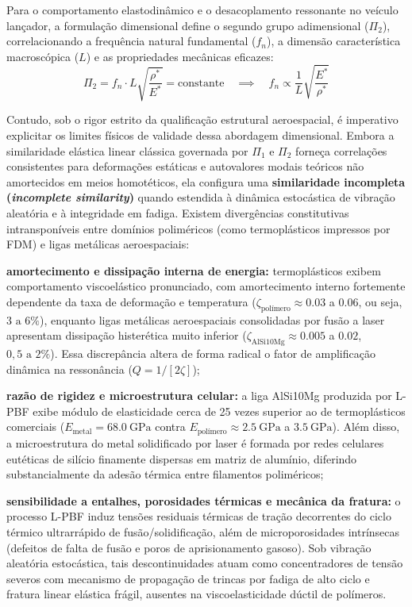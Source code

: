 Para o comportamento elastodinâmico e o desacoplamento ressonante no veículo lançador, a formulação dimensional define o segundo grupo adimensional ($\Pi_2$), correlacionando a frequência natural fundamental ($f_n$), a dimensão característica macroscópica ($L$) e as propriedades mecânicas eficazes:
\begin{equation}
  \Pi_2 = f_n \cdot L \sqrt{\frac{\rho^{*}}{E^{*}}} = \text{constante} \quad \implies \quad f_n \propto \frac{1}{L} \sqrt{\frac{E^{*}}{\rho^{*}}}
  \label{eq:fn}
\end{equation}

Contudo, sob o rigor estrito da qualificação estrutural aeroespacial, é imperativo explicitar os limites físicos de validade dessa abordagem dimensional. Embora a similaridade elástica linear clássica governada por $\Pi_1$ e $\Pi_2$ forneça correlações consistentes para deformações estáticas e autovalores modais teóricos não amortecidos em meios homotéticos, ela configura uma \textbf{similaridade incompleta (\textit{incomplete similarity})} quando estendida à dinâmica estocástica de vibração aleatória e à integridade em fadiga. Existem divergências constitutivas intransponíveis entre domínios poliméricos (como termoplásticos impressos por FDM) e ligas metálicas aeroespaciais:
\begin{alineas}
  \item \textbf{amortecimento e dissipação interna de energia:} termoplásticos exibem comportamento viscoelástico pronunciado, com amortecimento interno fortemente dependente da taxa de deformação e temperatura ($\zeta_{\text{polímero}} \approx \num{0.03}$ a $\num{0.06}$, ou seja, $3\text{ a }6\%$), enquanto ligas metálicas aeroespaciais consolidadas por fusão a laser apresentam dissipação histerética muito inferior ($\zeta_{\text{AlSi10Mg}} \approx \num{0.005}$ a $\num{0.02}$, $0{,}5\text{ a }2\%$). Essa discrepância altera de forma radical o fator de amplificação dinâmica na ressonância ($Q = 1 / [2\zeta]$);
  \item \textbf{razão de rigidez e microestrutura celular:} a liga AlSi10Mg produzida por L-PBF exibe módulo de elasticidade cerca de 25 vezes superior ao de termoplásticos comerciais ($E_{\text{metal}} = \SI{68.0}{\giga\pascal}$ contra $E_{\text{polímero}} \approx \SI{2.5}{\giga\pascal}$ a $\SI{3.5}{\giga\pascal}$). Além disso, a microestrutura do metal solidificado por laser é formada por redes celulares eutéticas de silício finamente dispersas em matriz de alumínio, diferindo substancialmente da adesão térmica entre filamentos poliméricos;
  \item \textbf{sensibilidade a entalhes, porosidades térmicas e mecânica da fratura:} o processo L-PBF induz tensões residuais térmicas de tração decorrentes do ciclo térmico ultrarrápido de fusão/solidificação, além de microporosidades intrínsecas (defeitos de falta de fusão e poros de aprisionamento gasoso). Sob vibração aleatória estocástica, tais descontinuidades atuam como concentradores de tensão severos com mecanismo de propagação de trincas por fadiga de alto ciclo e fratura linear elástica frágil, ausentes na viscoelasticidade dúctil de polímeros.
\end{alineas}

